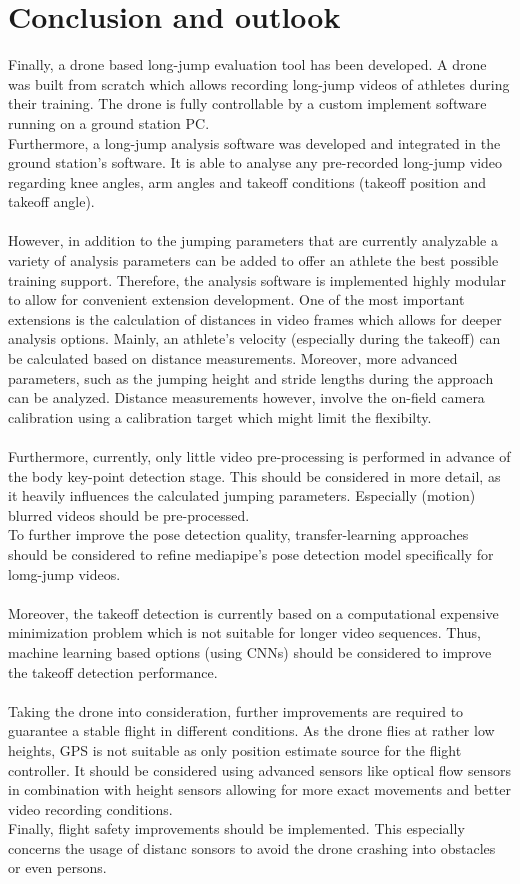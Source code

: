 \graphicspath{{./figures/}}
\chapter{Conclusion and outlook}
Finally, a drone based long-jump evaluation tool has been developed.
A drone was built from scratch which allows recording long-jump
videos of athletes during their training.
The drone is fully controllable by a custom implement software running on a
ground station PC.\\
Furthermore, a long-jump analysis software was developed and integrated in the
ground station's software.
It is able to analyse any pre-recorded long-jump video regarding
knee angles, arm angles and takeoff conditions (takeoff position and takeoff
angle).\\\\
\noindent However, in addition to the jumping parameters that are currently
analyzable a variety of analysis parameters can be added to offer an athlete
the best possible training support.
Therefore, the analysis software is implemented highly modular to allow for
convenient extension development.
One of the most important extensions is the calculation of distances in
video frames which allows for deeper analysis options.
Mainly, an athlete's velocity (especially during the takeoff) can be
calculated based on distance measurements.
Moreover, more advanced parameters, such as the jumping height and
stride lengths during the approach can be analyzed.
Distance measurements however, involve the on-field camera calibration
using a calibration target which might limit the flexibilty.\\\\
\noindent Furthermore, currently, only little video pre-processing is
performed in advance of the body key-point detection stage.
This should be considered in more detail, as it heavily influences the
calculated jumping parameters.
Especially (motion) blurred videos should be pre-processed.\\
To further improve the pose detection quality, transfer-learning approaches
should be considered to refine mediapipe's pose detection model specifically
for lomg-jump videos.\\\\
\noindent Moreover, the takeoff detection is currently based on a
computational expensive minimization problem which is not suitable
for longer video sequences.
Thus, machine learning based options (using \acp{CNN}) should be considered to
improve the takeoff detection performance.\\\\
\noindent Taking the drone into consideration, further improvements are
required to guarantee a stable flight in different conditions.
As the drone flies at rather low heights, \ac{GPS} is not suitable as only
position estimate source for the flight controller.
It should be considered using advanced sensors like optical flow sensors in
combination with height sensors allowing for more exact movements and better
video recording conditions.\\
Finally, flight safety improvements should be implemented.
This especially concerns the usage of distanc sonsors to avoid the drone
crashing into obstacles or even persons.         